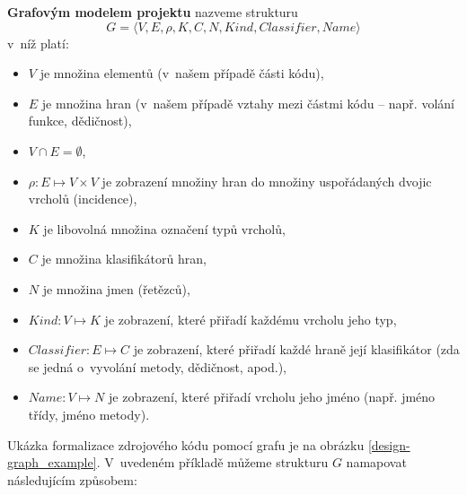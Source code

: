 \begin{definition}
\textbf{Grafovým modelem projektu} nazveme strukturu
\begin{displaymath}
  G = \langle V, E, \rho, K, C, N, \mathit{Kind}, \mathit{Classifier}, \mathit{Name}\rangle
  \label{extended_multigraph}
\end{displaymath}
v~níž platí:
\begin{itemize}
\item $V$ je množina elementů (v~našem případě části kódu),
\item $E$ je množina hran (v~našem případě vztahy mezi částmi kódu -- např. volání funkce, dědičnost),
\item $V \cap E = \emptyset$,
\item $\rho: E \mapsto V \times V$ je zobrazení množiny hran do množiny uspořádaných dvojic vrcholů (incidence),
\item $K$ je libovolná množina označení typů vrcholů,
\item $C$ je množina klasifikátorů hran,
\item $N$ je množina jmen (řetězců),
\item $\mathit{Kind}: V \mapsto K$ je zobrazení, které přiřadí každému vrcholu jeho typ,
\item $\mathit{Classifier}: E \mapsto C$ je zobrazení, které přiřadí každé hraně její klasifikátor (zda se jedná o~vyvolání metody, dědičnost, apod.),
\item $\mathit{Name}: V \mapsto N$ je zobrazení, které přiřadí vrcholu jeho jméno (např. jméno třídy, jméno metody).
\end{itemize}
\end{definition}

Ukázka formalizace zdrojového kódu pomocí grafu je na obrázku \ref{design-graph_example}. V~uvedeném příkladě můžeme strukturu $G$ namapovat následujícím způsobem:

